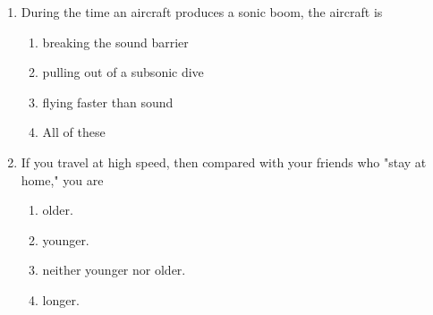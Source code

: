 \documentclass[12pt]{article}
\begin{document}
\begin{enumerate}[label=\arabic*.]
\item During the time an aircraft produces a sonic boom, the aircraft is
\begin{enumerate}[label=(\alph*)]
    \item breaking the sound barrier
    \item pulling out of a subsonic dive
    \item flying faster than sound
    \item All of these
\end{enumerate}
\item If you travel at high speed, then compared with your friends who "stay at home," you are
\begin{enumerate}[label=(\alph*)]
    \item older.
    \item younger.
    \item neither younger nor older.
    \item longer.
\end{enumerate}
\end{enumerate}
\end{document}
